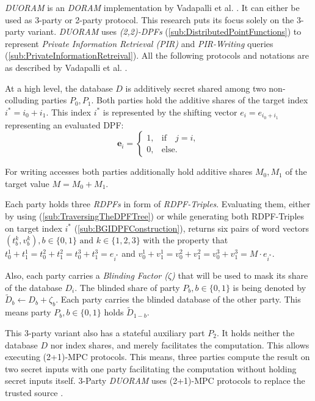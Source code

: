 \label{sec:3pDuoram}
\textit{DUORAM} is an \textit{DORAM} implementation by Vadapalli et al. \cite{vadapalli2023duoram}.
It can either be used as 3-party or 2-party protocol.
This research puts its focus solely on the 3-party variant.
\textit{DUORAM} uses \textit{(2,2)-DPFs} (\ref{sub:DistributedPointFunctions}) to represent \textit{Private Information Retrieval (PIR)} and \textit{PIR-Writing} queries (\ref{sub:PrivateInformationRetreival}).
All the following protocols and notations are as described by Vadapalli et al. \cite{vadapalli2023duoram}.

At a high level, the database $D$ is additively secret shared among two non-colluding parties $P_0,P_1$.
Both parties hold the additive shares of the target index $i^*=i_0+i_1$.
This index $i^*$ is represented by the shifting vector $e_i = e_{i_0+i_1}$ representing an evaluated DPF:
\[
\mathbf{e}_i = 
\begin{cases}
    1, & \text{if} \quad j = i, \\
    0, & \text{else}.
\end{cases}
\]

For writing accesses both parties additionally hold additive shares $M_0,M_1$ of the target value $M=M_0+M_1$.

Each party holds three \textit{RDPFs} in form of \textit{RDPF-Triples}.
Evaluating them, either by using  (\ref{sub:TraversingTheDPFTree}) or while generating both RDPF-Triples on target index $i^*$ (\ref{sub:BGIDPFConstruction}), returns six pairs of word vectors $(t_b^k,v_b^k), b\in\{0,1\}\text{ and }k\in\{1,2,3\}$ with the property that $t_0^1+t_1^1=t_0^2+t_1^2=t_0^3+t_1^3=e_{i^*}$ and $v_0^1+v_1^1=v_0^2+v_1^2=v_0^3+v_1^3=M\cdot e_{i^*}$.

Also, each party carries a \textit{Blinding Factor ($\zeta$)} that will be used to mask its share of the database $D_i$.
The blinded share of party $P_b, b\in\{0,1\}$ is being denoted by $\widetilde{D}_b\leftarrow D_b+\zeta_b$.
Each party carries the blinded database of the other party.
This means party $P_b, b\in\{0,1\}$ holds $\widetilde{D}_{1-b}$.

This 3-party variant also has a stateful auxiliary part $P_2$.
It holds neither the database $D$ nor index shares, and merely facilitates the computation.
This allows executing (2+1)-MPC protocols.
This means, three parties compute the result on two secret inputs with one party facilitating the computation without holding secret inputs itself.
3-Party \textit{DUORAM} uses (2+1)-MPC protocols to replace the trusted source \cite{vadapalli2023duoram}.

